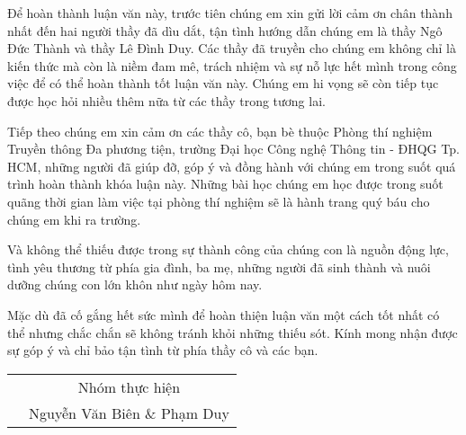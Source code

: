  
 
\begin{acknowledgements}      

Để hoàn thành luận văn này, trước tiên chúng em xin gửi lời cảm ơn chân thành nhất đến hai người thầy đã dìu dắt, tận tình hướng dẫn chúng em là thầy Ngô Đức Thành và thầy Lê Đình Duy. Các thầy đã truyền cho chúng em không chỉ là kiến thức mà còn là niềm đam mê, trách nhiệm và sự nỗ lực hết mình trong công việc để có thể hoàn thành tốt luận văn này. Chúng em hi vọng sẽ còn tiếp tục được học hỏi nhiều thêm nữa từ các thầy trong tương lai.

Tiếp theo chúng em xin cảm ơn các thầy cô, bạn bè thuộc Phòng thí nghiệm Truyền thông Đa phương tiện, trường Đại học Công nghệ Thông tin - ĐHQG Tp. HCM, những người đã giúp đỡ, góp ý và đồng hành với chúng em trong suốt quá trình hoàn thành khóa luận này. Những bài học chúng em học được trong suốt quãng thời gian làm việc tại phòng thí nghiệm sẽ là hành trang quý báu cho chúng em khi ra trường.

Và không thể thiếu được trong sự thành công của chúng con là nguồn động lực, tình yêu thương từ phía gia đình, ba mẹ, những người đã sinh thành và nuôi dưỡng chúng con lớn khôn như ngày hôm nay.

Mặc dù đã cố gắng hết sức mình để hoàn thiện luận văn một cách tốt nhất có thể nhưng chắc chắn sẽ không tránh khỏi những thiếu sót. Kính mong nhận được sự góp ý và chỉ bảo tận tình từ phía thầy cô và các bạn.

\FloatBarrier
\begin{table}
\begin{center}
	\begin{tabular}{p{6cm} c}
	 & Nhóm thực hiện \\
     & Nguyễn Văn Biên \& Phạm Duy \\
	\end{tabular}
\end{center}
\end{table}
\FloatBarrier

\end{acknowledgements}
  